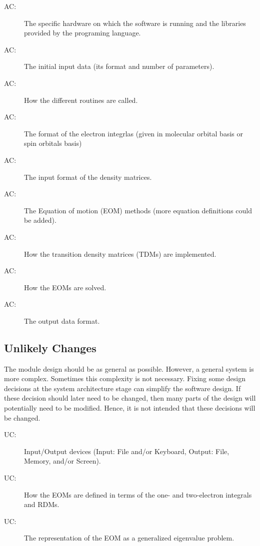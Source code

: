 \documentclass[12pt, titlepage]{article}
\newcounter{acnum}
\newcommand{\actheacnum}{AC\theacnum}
\newcounter{ucnum}
\newcommand{\uctheucnum}{UC\theucnum}
\begin{document}
\begin{description}
\item[ \actheacnum \label{acHardware}:] The specific
  hardware on which the software is running and the libraries 
  provided by the programing language.
\item[ \actheacnum \label{acInput}:] The
initial input data (its format and number of parameters).
\item[ \actheacnum \label{acDriver}:] How the different 
routines are called.
\item[ \actheacnum \label{acIntegrals}:] The format of 
the electron integrlas (given in molecular orbital basis or spin orbitals basis)
\item[ \actheacnum \label{acRDMs}:] The input format of 
the density matrices.
\item[ \actheacnum \label{acEOMs}:] The Equation of 
motion (EOM) methods (more equation definitions could be added).
\item[ \actheacnum \label{acTDMs}:] How the transition 
density matrices (TDMs) are implemented.
\item[ \actheacnum \label{acSolver}:] How the EOMs are 
solved.
\item[ \actheacnum \label{acOutput}:] The output data 
format.
\end{description}

\subsection{Unlikely Changes} \label{SecUchange}

The module design should be as general as possible. However, a general system is
more complex. Sometimes this complexity is not necessary. Fixing some design
decisions at the system architecture stage can simplify the software design. If
these decision should later need to be changed, then many parts of the design
will potentially need to be modified. Hence, it is not intended that these
decisions will be changed.

\begin{description}
\item[ \uctheucnum \label{ucIO}:] Input/Output devices
  (Input: File and/or Keyboard, Output: File, Memory, and/or Screen).
\item[ \uctheucnum \label{ucRDMs}:] How the EOMs are 
defined in terms of the one- and two-electron integrals and RDMs.
\item[ \uctheucnum \label{ucGenEigval}:] The 
representation of the EOM as a generalized eigenvalue problem.
\end{description}
\end{document}
